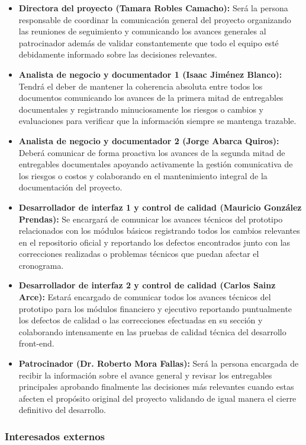 \documentclass[11pt,spanish]{article}
\begin{document}
\begin{itemize}
    \item \textbf{Directora del proyecto (Tamara Robles Camacho):} Será la persona responsable de coordinar la comunicación general del proyecto organizando las reuniones de seguimiento y comunicando los avances generales al patrocinador además de validar constantemente que todo el equipo esté debidamente informado sobre las decisiones relevantes.
    \item \textbf{Analista de negocio y documentador 1 (Isaac Jiménez Blanco):} Tendrá el deber de mantener la coherencia absoluta entre todos los documentos comunicando los avances de la primera mitad de entregables documentales y registrando minuciosamente los riesgos o cambios y evaluaciones para verificar que la información siempre se mantenga trazable.
    \item \textbf{Analista de negocio y documentador 2 (Jorge Abarca Quiros):} Deberá comunicar de forma proactiva los avances de la segunda mitad de entregables documentales apoyando activamente la gestión comunicativa de los riesgos o costos y colaborando en el mantenimiento integral de la documentación del proyecto.
    \item \textbf{Desarrollador de interfaz 1 y control de calidad (Mauricio González Prendas):} Se encargará de comunicar los avances técnicos del prototipo relacionados con los módulos básicos registrando todos los cambios relevantes en el repositorio oficial y reportando los defectos encontrados junto con las correcciones realizadas o problemas técnicos que puedan afectar el cronograma.
    \item \textbf{Desarrollador de interfaz 2 y control de calidad (Carlos Sainz Arce):} Estará encargado de comunicar todos los avances técnicos del prototipo para los módulos financiero y ejecutivo reportando puntualmente los defectos de calidad o las correcciones efectuadas en su sección y colaborando intensamente en las pruebas de calidad técnica del desarrollo front-end.
    \item \textbf{Patrocinador (Dr. Roberto Mora Fallas):} Será la persona encargada de recibir la información sobre el avance general y revisar los entregables principales aprobando finalmente las decisiones más relevantes cuando estas afecten el propósito original del proyecto validando de igual manera el cierre definitivo del desarrollo.
\end{itemize}

\subsubsection{Interesados externos}
\end{document}
